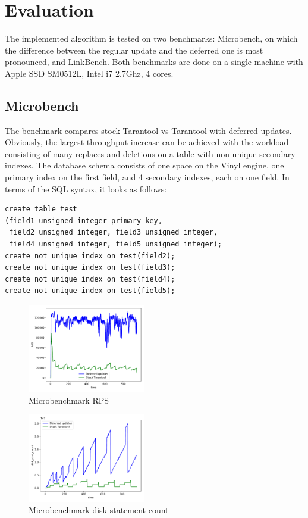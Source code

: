 \documentclass{vldb}
\begin{document}
\section{Evaluation}

The implemented algorithm is tested on two benchmarks: Microbench, on which the
difference between the regular update and the deferred one is most pronounced, and
LinkBench. Both benchmarks are done on a single machine with Apple SSD SM0512L,
Intel i7 2.7Ghz, 4 cores.

\subsection{Microbench}

The benchmark compares stock Tarantool vs Tarantool with deferred updates.
Obviously, the largest throughput increase can be achieved with the workload
consisting of many replaces and deletions on a table with non-unique secondary
indexes. The database schema consists of one space on the Vinyl engine, one primary
index on the first field, and 4 secondary indexes, each on one field. In terms of the
SQL syntax, it looks as follows:
\begin{verbatim}
create table test
(field1 unsigned integer primary key,
 field2 unsigned integer, field3 unsigned integer,
 field4 unsigned integer, field5 unsigned integer);
create not unique index on test(field2);
create not unique index on test(field3);
create not unique index on test(field4);
create not unique index on test(field5);
\end{verbatim}

\begin{figure}
\centering
\includegraphics[width=0.46\textwidth]{rps_microbench}
\caption{Microbenchmark RPS}
\label{fig:rps_microbench}
\end{figure}

\begin{figure}
\centering
\includegraphics[width=0.46\textwidth]{disk_stmt_microbench}
\caption{Microbenchmark disk statement count}
\label{fig:disk_stmt_microbench}
\end{figure}
\end{document}

